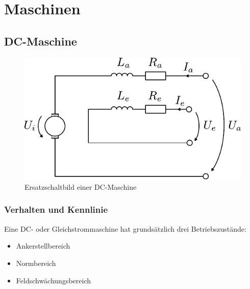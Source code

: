 \chapter{Maschinen}

\newpage

\section{DC-Maschine}

\begin{figure}[h!]
\centering
\includegraphics[scale=\schscale]{dc-motor.pdf}
\caption{Ersatzschaltbild einer DC-Maschine}
\label{sch:dc-maschine}
\end{figure}

\subsection{Verhalten und Kennlinie}

Eine DC- oder Gleichstrommaschine hat grundsätzlich drei Betriebszustände:
\begin{itemize}
	\item Ankerstellbereich
	\item Normbereich
	\item Feldschwächungsbereich
\end{itemize}

